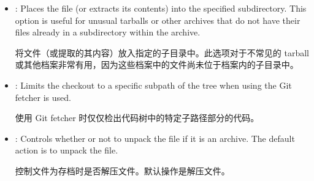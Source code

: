 {\begin{itemize}
\medskip
\begin{codeblock}
\footnotesize
\texttt{\noindent
SRC\_URI = "git://example.com/foo.git;branch=main;name=first  \textbackslash  \linebreak
${}$\ \ \ \ \ \ \ \ \ \ \ git://example.com/bar.git;branch=main;name=second  \textbackslash  \linebreak
${}$\ \ \ \ \ \ \ \ \ \ \ http://example.com/file.tar.gz;name=third" \linebreak
\linebreak
SRCREV\_first = "f1d2d2f924e986ac86fdf7b36c94bcdf32beec15" \linebreak
SRCREV\_second = "e242ed3bffccdf271b7fbaf34ed72d089537b42f" \linebreak
SRC\_URI[third.sha256sum] = "13550350a8681c84c861aac2e5b440161c2b33a3e4f302ac680ca5b686de48de" \linebreak
}
\end{codeblock}

\medskip
\item {}: Places the file (or extracts its contents) into the specified subdirectory. This option is useful for unusual tarballs or other archives that do not have their files already in a subdirectory within the archive. \par
将文件（或提取的其内容）放入指定的子目录中。此选项对于不常见的 tarball 或其他档案非常有用，因为这些档案中的文件尚未位于档案内的子目录中。

\item {}: Limits the checkout to a specific subpath of the tree when using the Git fetcher is used.\par
使用 Git fetcher 时仅仅检出代码树中的特定子路径部分的代码。

\item {}: Controls whether or not to unpack the file if it is an archive. The default action is to unpack the file. \par
控制文件为存档时是否解压文件。默认操作是解压文件。
\end{itemize}

}


